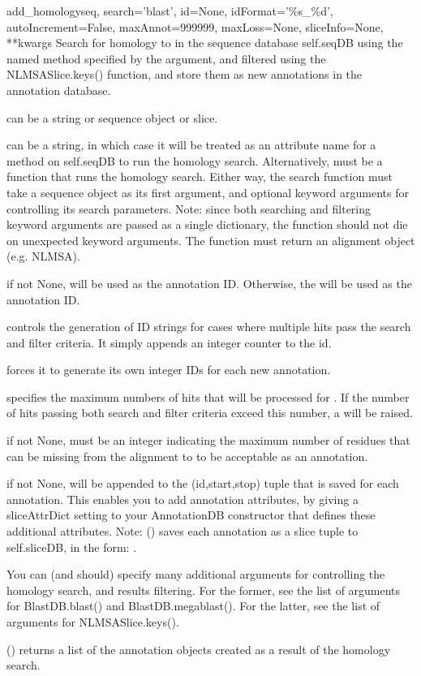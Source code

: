 \documentclass{howto}
\begin{document}
\begin{funcdesc}{add_homology}{seq, search='blast', id=None, idFormat='\%s_\%d', autoIncrement=False, maxAnnot=999999, maxLoss=None, sliceInfo=None, **kwargs}
  Search for homology to  in the sequence database self.seqDB
  using the named method specified by the  argument,
  and filtered using the NLMSASlice.keys() function, and store
  them as new annotations in the annotation database.  

   can be a string or sequence object or slice.

   can be a string, in which case it will be treated as an
  attribute name for a method on self.seqDB to run the homology search.
  Alternatively,  must be a function that runs the homology search.
  Either way, the search function must take a sequence object as its
  first argument, and optional keyword arguments for controlling its
  search parameters.  Note: since both searching and filtering keyword
  arguments are passed as a single dictionary, the function should not
  die on unexpected keyword arguments.  The function must return an
  alignment object (e.g. NLMSA).

   if not None, will be used as the annotation ID.  Otherwise,
  the  will be used as the annotation ID.

   controls the generation of ID strings for cases where
  multiple hits pass the search and filter criteria.  It simply appends
  an integer counter to the id.

   forces it to generate its own integer IDs for
  each new annotation.

   specifies the maximum numbers of hits that will be
  processed for .  If the number of hits passing both search
  and filter criteria exceed this number, a  will be raised.

   if not None, must be an integer indicating the maximum
  number of residues that can be missing from the alignment to 
  to be acceptable as an annotation.

   if not None, will be appended to the (id,start,stop)
  tuple that is saved for each annotation.  This enables you to add
  annotation attributes, by giving a sliceAttrDict setting to your AnnotationDB
  constructor that defines these additional attributes.  Note: ()
  saves each annotation as a slice tuple to self.sliceDB, in the form:
  .

  You can (and should) specify many additional arguments for controlling
  the homology search, and results filtering.  For the former, see the list
  of arguments for BlastDB.blast() and BlastDB.megablast().  For the latter,
  see the list of arguments for NLMSASlice.keys().

  () returns a list of the annotation objects 
  created as a result of the homology search.
\end{funcdesc}
\end{document}

